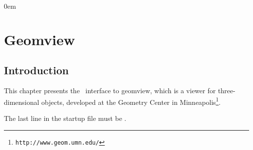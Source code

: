 \newcommand{\Section}[1]{Section~{\protect\ref{#1}}}
\newcommand{\Chapter}[1]{Chapter~{\protect\ref{#1}}}
\newcommand{\new}[1]{\marginpar{\sf #1}}

\newcommand{\what}{\mbox{?\hspace*{2cm}?}}


\parindent0em
\setlength{\parskip}{1ex minus 0.9ex}
\sloppy

\newcommand{\note}[1]{{\bf NOTE: #1}}

\chapter{Geomview} \label{ChapterGeomview}


\section{Introduction}

This chapter presents the \cgal\ interface to geomview, which is a
viewer for three-dimensional objects, developed at the Geometry Center
in Minneapolis\footnote{\tt http://www.geom.umn.edu/}.

 The last line in the startup file 
must be .

